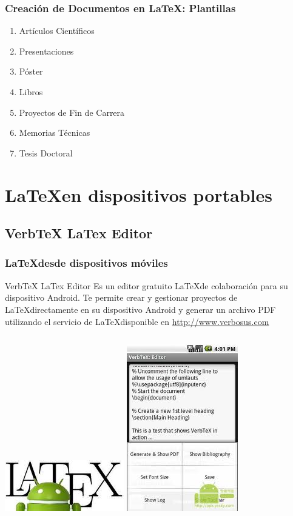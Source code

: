 \documentclass[sans serif,9pt,xcolor=dvipsnames]{beamer}%
\begin{document}
\begin{frame}
\frametitle {Creación de Documentos en \LaTeX : Plantillas}
\begin{enumerate}
\item Artículos Científicos
\item Presentaciones
\item Póster
\item Libros
\item Proyectos de Fin de Carrera 
\item Memorias Técnicas
\item Tesis Doctoral
\end{enumerate}
\end{frame}

\section{\LaTeX  en dispositivos portables}
\subsection{VerbTeX LaTex Editor}
\begin{frame}
\frametitle{\LaTeX desde dispositivos móviles}
\begin{block}{VerbTeX LaTex Editor}
\justifying
Es un editor gratuito \LaTeX de colaboración para su dispositivo Android. Te permite crear y gestionar proyectos de \LaTeX directamente en su dispositivo Android y generar un archivo PDF utilizando el servicio de \LaTeX disponible en \textcolor{blue}{\url{http://www.verbosus.com}}  
\end{block}
\begin{center}
\begin{columns}
 \hspace{0.7cm}
\includegraphics[width=2.5 cm]{imagenes/verbtex.jpg} 
\includegraphics[width=2.5 cm]{imagenes/movilVerbtex.jpg} 
\end{columns}
\end{center}




\end{frame}
\end{document}
